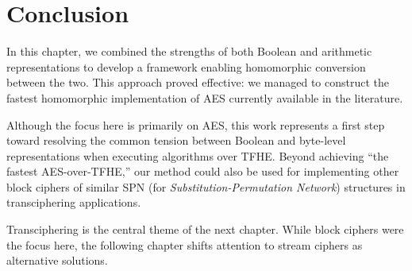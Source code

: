 \section{Conclusion}


In this chapter, we combined the strengths of both Boolean and arithmetic representations to develop a framework enabling homomorphic conversion between the two. This approach proved effective: we managed to construct the fastest homomorphic implementation of \gls{AES} currently available in the literature.

Although the focus here is primarily on \gls{AES}, this work represents a first step toward resolving the common tension between Boolean and byte-level representations when executing algorithms over \gls{TFHE}. Beyond achieving “the fastest \gls{AES}-over-\gls{TFHE},” our method could also be used for implementing other block ciphers of similar SPN (for \textit{Substitution-Permutation Network}) structures in transciphering applications.

Transciphering is the central theme of the next chapter. While block ciphers were the focus here, the following chapter shifts attention to stream ciphers as alternative solutions. 